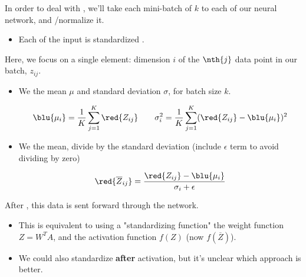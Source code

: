             \begin{concept}
                In order to deal with , we'll take each mini-batch of $k$  to each  of our neural network, and /normalize it.

                \begin{itemize}
                    \item Each  of the input is standardized .
                \end{itemize}

                \subsecdiv

                Here, we focus on a single element: dimension $i$ of the $\nth{j}$ data point in our batch, $z_{ij}$.

                \begin{itemize}
                    \item We  the mean $\mu$ and standard deviation $\sigma$, for batch size $k$.

                    \begin{equation*}
                        \blu{\mu_i} =\frac{1}{K} \sum_{j=1}^K \red{Z_{ij}}
                        \qquad
                        \sigma^2_i = \frac{1}{K} \sum_{j=1}^K (\red{Z_{ij}}-\blu{\mu_i})^2 
                    \end{equation*}
                    
                    \item We  the mean, divide by the standard deviation (include $\epsilon$ term to avoid dividing by zero)

                    \begin{equation*}
                        \red{ \overline{Z}_{ij} } =  \frac{ \red{Z_{ij}}  -\blu{\mu_i}}{\sigma_i+\epsilon}
                    \end{equation*}

                    
                \end{itemize}

                \subsecdiv

                After , this data is sent forward through the network.

                \begin{itemize}
                    \item This is equivalent to using a "standardizing function"  the weight function $Z=W^TA$, and  the activation function $f(Z)$ (now $f(\overline{Z})$).
                    \item We could also standardize \textbf{after} activation, but it's unclear which approach is better.
                \end{itemize}
                
            \end{concept}

